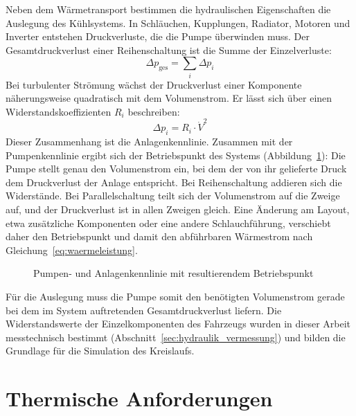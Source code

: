 Neben dem Wärmetransport bestimmen die hydraulischen Eigenschaften die Auslegung
des Kühlsystems. In Schläuchen, Kupplungen, Radiator, Motoren und Inverter
entstehen Druckverluste, die die Pumpe überwinden muss. Der Gesamtdruckverlust
einer Reihenschaltung ist die Summe der Einzelverluste:
\begin{equation}
  \Delta p_\mathrm{ges} = \sum_i \Delta p_i
  \label{eq:dp_ges}
\end{equation}
Bei turbulenter Strömung wächst der Druckverlust einer Komponente näherungsweise
quadratisch mit dem Volumenstrom. Er lässt sich über einen
Widerstandskoeffizienten $R_i$ beschreiben:
\begin{equation}
  \Delta p_i = R_i \cdot \dot{V}^{2}
  \label{eq:dp_komponente}
\end{equation}
Dieser Zusammenhang ist die Anlagenkennlinie. Zusammen mit der Pumpenkennlinie
ergibt sich der Betriebspunkt des Systems (Abbildung~\ref{fig:pumpe_anlage}):
Die Pumpe stellt genau den Volumenstrom ein, bei dem der von ihr gelieferte
Druck dem Druckverlust der Anlage entspricht. Bei Reihenschaltung addieren sich
die Widerstände. Bei Parallelschaltung teilt sich der Volumenstrom auf die
Zweige auf, und der Druckverlust ist in allen Zweigen gleich. Eine Änderung am
Layout, etwa zusätzliche Komponenten oder eine andere Schlauchführung,
verschiebt daher den Betriebspunkt und damit den abführbaren Wärmestrom nach
Gleichung~\eqref{eq:waermeleistung}.

\begin{figure}[htb]
  \centering
  \caption{Pumpen- und Anlagenkennlinie mit resultierendem Betriebspunkt}
  \label{fig:pumpe_anlage}
\end{figure}

Für die Auslegung muss die Pumpe somit den benötigten Volumenstrom gerade bei
dem im System auftretenden Gesamtdruckverlust liefern. Die Widerstandswerte der
Einzelkomponenten des Fahrzeugs wurden in dieser Arbeit messtechnisch bestimmt
(Abschnitt~\ref{sec:hydraulik_vermessung}) und bilden die Grundlage für die
Simulation des Kreislaufs.

\section{Thermische Anforderungen}
\label{sec:thermische_anforderungen}

